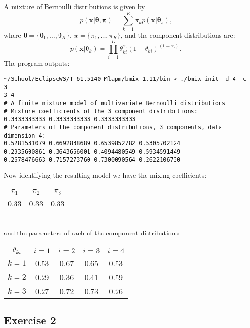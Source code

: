 \documentclass[a4paper,oneside,article]{memoir}
\begin{document}
A mixture of Bernoulli distributions is given by
\begin{equation}
p(\mathbf{x}|\boldsymbol\theta, \boldsymbol\pi)=\sum\limits_{k=1}^{K}\pi_k p(\mathbf{x}|\boldsymbol\theta_k)\textrm{,}
\end{equation}
where $\boldsymbol\theta = \{\boldsymbol\theta_1,\ldots,\boldsymbol\theta_K\}$, $\boldsymbol\pi = \{\pi_1,\ldots,\pi_K\}$, and the component distributions are:
\begin{equation}
p(\mathbf{x}|\boldsymbol\theta_k) = \prod\limits_{i=1}^{D} \theta_{ki}^{x_i}(1-\theta_{ki})^{(1-x_i)}\textrm{.}
\end{equation}
The program outputs:
\begin{lstlisting}
~/School/EclipseWS/T-61.5140 Mlapm/bmix-1.11/bin > ./bmix_init -d 4 -c 3
3 4
# A finite mixture model of multivariate Bernoulli distributions
# Mixture coefficients of the 3 component distributions:
0.3333333333 0.3333333333 0.3333333333 
# Parameters of the component distributions, 3 components, data dimension 4:
0.5281531079 0.6692838689 0.6539852782 0.5305702124 
0.2935600861 0.3643666001 0.4094480549 0.5934591449 
0.2678476663 0.7157273760 0.7300090564 0.2622106730 
\end{lstlisting}
Now identifying the resulting model we have the mixing coefficients:
\begin{table}[h]
	\centering
		\begin{tabular}{c c c}
		$\pi_1$ & $\pi_2$ & $\pi_3$ \\
		0.33 & 0.33 &  0.33
		\end{tabular}
\end{table}
\\and the parameters of each of the component distributions:
\begin{table}[h]
	\centering
		\begin{tabular}{c c c c c}
		$\theta_{ki}$ & $i = 1$ & $i = 2$ & $i = 3$ & $i = 4$ \\
		$k=1$ & 0.53 & 0.67 & 0.65 & 0.53 \\
		$k=2$ & 0.29 & 0.36 & 0.41 & 0.59 \\
		$k=3$ & 0.27 & 0.72 & 0.73 & 0.26 \\
		\end{tabular}
\end{table}

\subsection*{Exercise 2}
\end{document}
